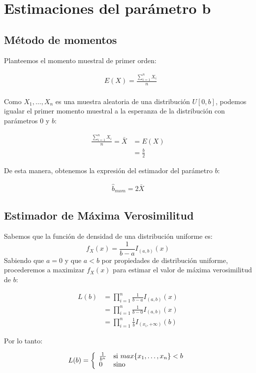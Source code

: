 \section{Estimaciones del parámetro b}
\subsection{Método de momentos}
Planteemos el momento muestral de primer orden:

\begin{align*}
	&E(X) = \frac{\sum_{i=1}^{n}X_{i}}{n} \\
\end{align*}

Como $X_{1}, \dots, X_{n}$ es una muestra aleatoria de una distribución $U[0, b]$, podemos igualar el primer momento muestral a la esperanza de la distribución con parámetros $0$ y $b$:

\begin{align*}
	\frac{\sum_{i=1}^{n}X_{i}}{n} = \bar{X} &= E(X) \\
	&= \frac{b}{2}
\end{align*}

De esta manera, obtenemos la expresión del estimador del parámetro $b$:

\begin{align*}
	\hat{b}_{mom} = 2 \bar{X}
\end{align*}

\subsection{Estimador de Máxima Verosimilitud}
Sabemos que la función de densidad de una distribución uniforme es:
$$f_{X}(x)=\frac{1}{b - a}I_{(a, b)}(x)$$
Sabiendo que $a = 0$ y que $a < b$ por propiedades de distribución uniforme, procederemos a maximizar $f_{X}(x)$ para estimar el valor de máxima verosimilitud de $b$:

\begin{align*}
	L(b) &= \prod_{i=1}^{n}\frac{1}{b - a}I_{(a, b)}(x) \\
		 &= \prod_{i=1}^{n}\frac{1}{b - 0}I_{(a, b)}(x) \\
		 &= \prod_{i=1}^{n}\frac{1}{b}I_{(x_{i}, +\infty)}(b)
\end{align*}

Por lo tanto:

\begin{center}
\begin{displaymath}
L(b) = \left\{
\begin{array}{l l}
			\frac{1}{b^n} & \text{si }max\{x_{1}, \dots, x_{n}\} < b\\
			0 & \text{sino}
\end{array}
\right.
\end{displaymath}
\end{center}

